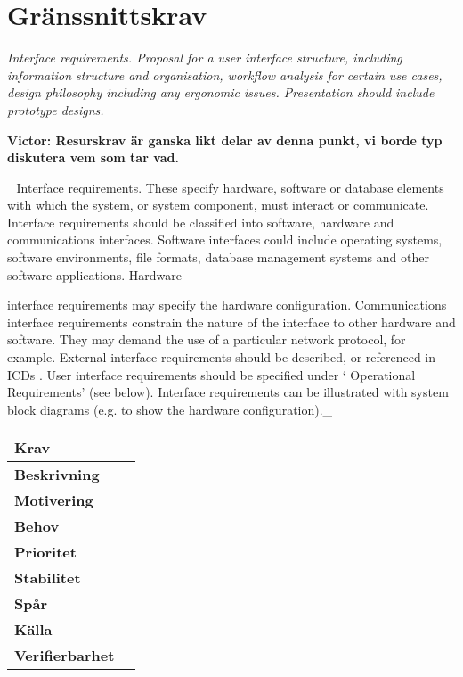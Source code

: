 \documentclass[a4paper, twoside, 11pt, titlepage]{article}
\begin{document}
\clearpage
\section{Gränssnittskrav}


\emph{Interface requirements. Proposal for a user interface structure, including information structure and organisation, workflow analysis for certain use cases, design philosophy including any ergonomic issues. Presentation should include prototype designs.}

\textbf{Victor: Resurskrav är ganska likt delar av denna punkt, vi borde typ diskutera vem som tar vad.}

\_Interface requirements. These specify hardware, software or database elements with which the system, or system component, must interact or communicate. Interface requirements should be classified into software, hardware and communications interfaces. Software interfaces could include operating systems, software environments, file formats, database management systems and other software applications. Hardware

interface requirements may specify the hardware configuration. Communications interface requirements constrain the nature of the interface to other hardware and software. They may demand the use of a particular network protocol, for example. External interface requirements should be described, or referenced in ICDs . User interface requirements should be specified under  ‘ Operational Requirements’  (see below). Interface requirements can be illustrated with system block diagrams (e.g. to show the hardware configuration).\_

\begin{tabular} { p{2.6cm} p{12.5cm} }
	\hline
	\sffamily\textbf{Krav} &   \\
	\hline
	\sffamily\textbf{Beskrivning} &    \\
	\hline
	\sffamily\textbf{Motivering} &   \\
	\hline
	\sffamily\textbf{Behov} &   \\
	\hline
	\sffamily\textbf{Prioritet} &   \\
	\hline
	\sffamily\textbf{Stabilitet} &   \\
	\hline
	\sffamily\textbf{Spår} &   \\
	\hline
	\sffamily\textbf{Källa} &   \\
	\hline
	\sffamily\textbf{Verifierbarhet} &   \\
	\hline
\end{tabular}
\end{document}
